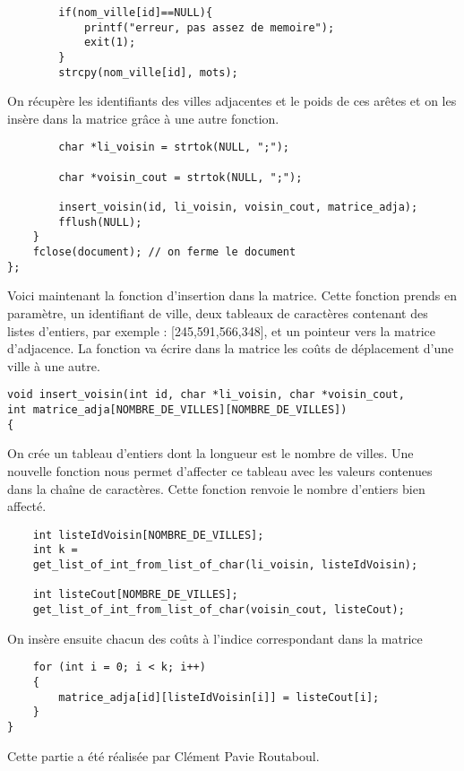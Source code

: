 \documentclass[a4paper, 12pt]{article}
\begin{document}
        \begin{lstlisting}
        if(nom_ville[id]==NULL){
            printf("erreur, pas assez de memoire");
            exit(1);
        }
        strcpy(nom_ville[id], mots);        
        \end{lstlisting}
        On récupère les identifiants des villes adjacentes et le poids de ces arêtes et on les insère dans la matrice grâce à une autre fonction.
        \begin{lstlisting}
        char *li_voisin = strtok(NULL, ";");

        char *voisin_cout = strtok(NULL, ";");

        insert_voisin(id, li_voisin, voisin_cout, matrice_adja); 
        fflush(NULL);  
    }
    fclose(document); // on ferme le document
};
\end{lstlisting}

Voici maintenant la fonction d'insertion dans la matrice.
Cette fonction prends en paramètre, un identifiant de ville, deux tableaux de caractères contenant des listes d'entiers, par exemple : [245,591,566,348],
et un pointeur vers la matrice d'adjacence. La fonction va écrire dans la matrice les coûts de déplacement d'une ville à une autre.
\begin{lstlisting}
void insert_voisin(int id, char *li_voisin, char *voisin_cout,
int matrice_adja[NOMBRE_DE_VILLES][NOMBRE_DE_VILLES])
{\end{lstlisting}
On crée un tableau d'entiers dont la longueur est le nombre de villes.
Une nouvelle fonction nous permet d'affecter ce tableau avec les valeurs contenues dans la chaîne de caractères.
Cette fonction renvoie le nombre d'entiers bien affecté.
\begin{lstlisting}
    int listeIdVoisin[NOMBRE_DE_VILLES];
    int k = 
    get_list_of_int_from_list_of_char(li_voisin, listeIdVoisin);

    int listeCout[NOMBRE_DE_VILLES];
    get_list_of_int_from_list_of_char(voisin_cout, listeCout); 
\end{lstlisting}
On insère ensuite chacun des coûts à l'indice correspondant dans la matrice
\begin{lstlisting}
    for (int i = 0; i < k; i++)
    {
        matrice_adja[id][listeIdVoisin[i]] = listeCout[i];
    }
}
\end{lstlisting}

        Cette partie a été réalisée par Clément Pavie Routaboul.
\end{document}
